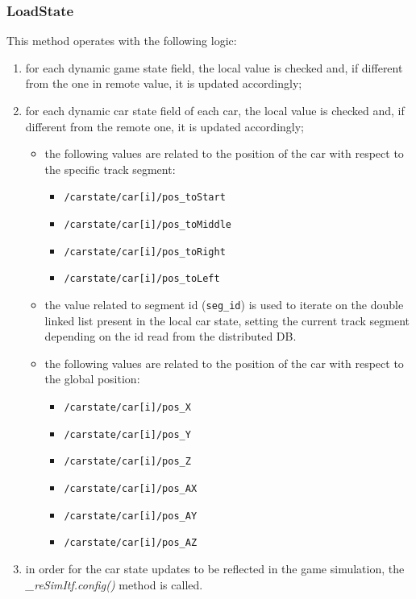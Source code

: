 \subsubsection{LoadState}
This method operates with the following logic:
\begin{enumerate}
	\item for each dynamic game state field, the local value is checked and, if different from the one in remote value, it is updated accordingly;
	\item for each dynamic car state field of each car, the local value is checked and, if different from the remote one, it is updated accordingly;
	\begin{itemize}
		\item the following values are related to the position of the car with respect to the specific track segment:
		\begin{itemize}
			\item \texttt{/carstate/car[i]/pos\_toStart}
			\item \texttt{/carstate/car[i]/pos\_toMiddle}
			\item \texttt{/carstate/car[i]/pos\_toRight}
			\item \texttt{/carstate/car[i]/pos\_toLeft}
		\end{itemize}
		\item the value related to segment id (\texttt{seg\_id}) is used to iterate on the double linked list present in the local car state, setting the current track segment depending on the id read from the distributed DB.
		\item the following values are related to the position of the car with respect to the global position:
		\begin{itemize}
			\item \texttt{/carstate/car[i]/pos\_X}
			\item \texttt{/carstate/car[i]/pos\_Y}
			\item \texttt{/carstate/car[i]/pos\_Z}
			\item \texttt{/carstate/car[i]/pos\_AX}
			\item \texttt{/carstate/car[i]/pos\_AY}
			\item \texttt{/carstate/car[i]/pos\_AZ}
		\end{itemize}
	\end{itemize}
	\item in order for the car state updates to be reflected in the game simulation, the \textit{\_reSimItf.config()} method is called.
\end{enumerate}

